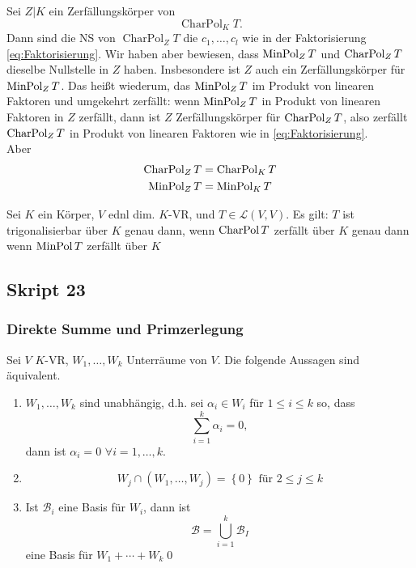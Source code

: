 \begin{subproof*}[Proposition]
	Sei $ Z | K $ ein Zerfällungskörper von
	\[
		\operatorname{Char Pol}_K T.
	\]
	Dann sind die NS von $ \operatorname{Char Pol}_Z T $ die $ c_1, \dotsc, c_l $ wie in der Faktorisierung \eqref{eq:Faktorisierung}.
	Wir haben aber bewiesen, dass $ \operatorname{Min Pol}_Z T $ und $ \operatorname{Char Pol}_Z T $ dieselbe Nullstelle in $ Z $ haben.
	Insbesondere ist $ Z $ auch ein Zerfällungskörper für $ \operatorname{Min Pol}_Z T $.
	Das heißt wiederum, das $ \operatorname{Min Pol}_Z T $ im Produkt von linearen Faktoren und umgekehrt zerfällt:
	wenn $ \operatorname{Min Pol}_Z T $ in Produkt von linearen Faktoren in $ Z $ zerfällt, dann ist $ Z $ Zerfällungskörper für $ \operatorname{Char Pol}_Z T $, also zerfällt $ \operatorname{Char Pol}_Z T $ in Produkt von linearen Faktoren wie in \eqref{eq:Faktorisierung}.\\
	Aber
	\begin{align*}
		\operatorname{Char Pol}_Z T &= \operatorname{Char Pol}_K T \\
		\operatorname{Min Pol}_Z T &= \operatorname{Min Pol}_K T \\
	\end{align*}
\end{subproof*}

\begin{subcorollary}
	Sei $ K $ ein Körper, $ V $ ednl dim. $ K $-VR, und $ T \in \mathcal{L} (V, V) $.
	Es gilt:
	$ T $ ist trigonalisierbar über $ K $ genau dann, wenn $ \operatorname{Char Pol} T $ zerfällt über $ K $ genau dann wenn $ \operatorname{Min Pol} T $ zerfällt über $ K $
\end{subcorollary}

\subsection{Skript 23}
\setcounter{subsubsection}{12}
\subsubsection{Direkte Summe und Primzerlegung}
\begin{sublemma}
	Sei $ V $ $ K $-VR, $ W_1, \dotsc, W_k $ Unterräume von $ V $.
	Die folgende Aussagen sind äquivalent.
	\begin{enumerate}[label=(\roman*)]
		\item $ W_1, \dotsc, W_k $ sind unabhängig, d.h. sei $ \alpha_i \in W_i $ für $ 1 \leq i \leq k $ so, dass
			\[
				\sum_{i=1}^{k} \alpha_i = 0,
			\]
			dann ist $ \alpha_i = 0 $ $ \forall i = 1, \dotsc, k $.
		\item 
			\[
				W_j \cap \left( W_1, \dotsc, W_j \right) = \left\{ 0 \right\} \text{ für }  2 \leq j \leq k
			\]
		\item Ist $ \mathcal{B} _i $ eine Basis für $ W_i $, dann ist
			\[
				\mathcal{B} = \bigcup_{i = 1} ^{k} \mathcal{B} _I
			\]
			eine Basis für $ W_1 + \dotsb + W_k $\qed
	\end{enumerate}
\end{sublemma}

